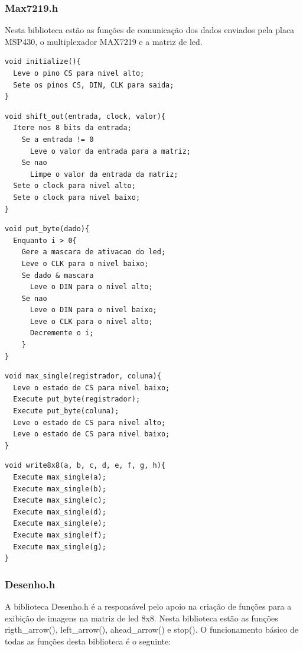 \documentclass[conference]{IEEEtran}
\begin{document}
\subsubsection{Max7219.h}
Nesta biblioteca estão as funções de comunicação dos dados enviados pela placa MSP430, o multiplexador MAX7219 e a matriz de led.
\begin{lstlisting}
void initialize(){
  Leve o pino CS para nivel alto;
  Sete os pinos CS, DIN, CLK para saida;
}
\end{lstlisting}

\begin{lstlisting}
void shift_out(entrada, clock, valor){
  Itere nos 8 bits da entrada;
    Se a entrada != 0
      Leve o valor da entrada para a matriz;
    Se nao
      Limpe o valor da entrada da matriz;
  Sete o clock para nivel alto;
  Sete o clock para nivel baixo; 
}
\end{lstlisting}

\begin{lstlisting}
void put_byte(dado){
  Enquanto i > 0{
	Gere a mascara de ativacao do led;
	Leve o CLK para o nivel baixo;
	Se dado & mascara
	  Leve o DIN para o nivel alto;
	Se nao
	  Leve o DIN para o nivel baixo;
	  Leve o CLK para o nivel alto;
	  Decremente o i;	
	}
}
\end{lstlisting}

\begin{lstlisting}
void max_single(registrador, coluna){
  Leve o estado de CS para nivel baixo;
  Execute put_byte(registrador);
  Execute put_byte(coluna);
  Leve o estado de CS para nivel alto;
  Leve o estado de CS para nivel baixo;
}
\end{lstlisting}

\begin{lstlisting}
void write8x8(a, b, c, d, e, f, g, h){
  Execute max_single(a);
  Execute max_single(b);
  Execute max_single(c);
  Execute max_single(d);
  Execute max_single(e);
  Execute max_single(f);
  Execute max_single(g);
}
\end{lstlisting}

\subsubsection{Desenho.h}
A biblioteca Desenho.h é a responsável pelo apoio na criação de funções para a exibição de imagens na matriz de led 8x8. Nesta biblioteca estão as funções rigth\_arrow(), left\_arrow(), ahead\_arrow() e stop(). O funcionamento básico de todas as funções desta biblioteca é o seguinte:
\end{document}
